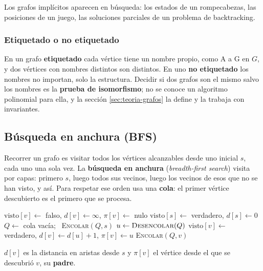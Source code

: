 \documentclass[11pt,letterpaper]{article}
\begin{document}
Los grafos implícitos aparecen en búsqueda: los estados de un
rompecabezas, las posiciones de un juego, las soluciones parciales de
un problema de backtracking.

\subsubsection*{Etiquetado o no etiquetado}

En un grafo \textbf{etiquetado} cada vértice tiene un nombre propio,
como A a G en $G$, y dos vértices con nombres distintos son
distintos. En uno \textbf{no etiquetado} los nombres no importan,
solo la estructura. Decidir si dos grafos son el mismo salvo los
nombres es la \textbf{prueba de isomorfismo}; no se conoce un
algoritmo polinomial para ella, y la sección \ref{sec:teoria-grafos}
la define y la trabaja con invariantes.


\subsection*{Búsqueda en anchura (BFS)}

Recorrer un grafo es visitar todos los vértices alcanzables desde uno
inicial $s$, cada uno una sola vez. La \textbf{búsqueda en anchura}
(\textit{breadth-first search}) visita por capas: primero $s$, luego
todos sus vecinos, luego los vecinos de esos que no se han visto, y
así. Para respetar ese orden usa una \textbf{cola}: el primer vértice
descubierto es el primero que se procesa.

\begin{algorithm}[H]
\caption{\textsc{BFS}$(G, s)$}
\begin{algorithmic}[1]
  \State $\text{visto}[v] \gets$ falso, \quad $d[v] \gets \infty$,
         \quad $\pi[v] \gets$ nulo
\EndFor
\State $\text{visto}[s] \gets$ verdadero, \quad $d[s] \gets 0$
\State $Q \gets$ cola vacía; \ \textsc{Encolar}$(Q, s)$
  \State $u \gets \textsc{Desencolar}(Q)$
      \State $\text{visto}[v] \gets$ verdadero, \quad
             $d[v] \gets d[u] + 1$, \quad $\pi[v] \gets u$
      \State \textsc{Encolar}$(Q, v)$
    \EndIf
  \EndFor
\EndWhile
\end{algorithmic}
\end{algorithm}

$d[v]$ es la distancia en aristas desde $s$ y $\pi[v]$ el vértice desde
el que se descubrió $v$, su \textbf{padre}.
\end{document}
